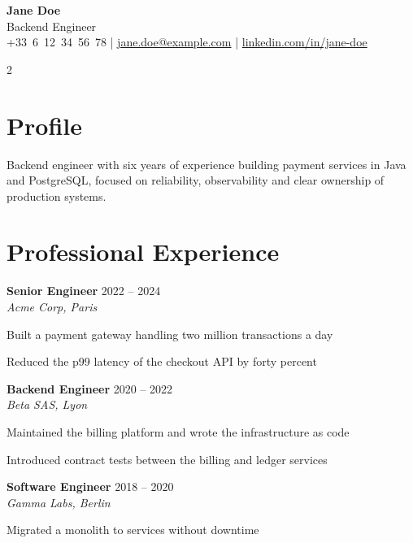 \documentclass[10pt]{extarticle}
\newcommand{\role}[3]{%
  \textbf{#1} \hfill {\color{soft}\small #3}\\[-1pt]
  {\itshape\small #2}\par
}
\begin{document}
\begin{center}
    {\fontsize{18}{18}\selectfont\bfseries\color{accent} Jane Doe}\\[3pt]
    {\normalsize\color{soft} Backend Engineer}\\[4pt]
    {\footnotesize
      +33~6~12~34~56~78 \quad|\quad
      \href{mailto:jane.doe@example.com}{jane.doe@example.com} \quad|\quad
      \href{https://www.linkedin.com/in/jane-doe}{linkedin.com/in/jane-doe}
    }
\end{center}
\vspace{-9pt}

\begin{multicols}{2}
\section{Profile}

Backend engineer with six years of experience building payment services in Java and PostgreSQL, focused on reliability, observability and clear ownership of production systems.

\section{Professional Experience}

\role{Senior Engineer}{Acme Corp, Paris}{2022 – 2024}

\begin{tightlist}
    \item Built a payment gateway handling two million transactions a day

    \item Reduced the p99 latency of the checkout API by forty percent

\end{tightlist}

\role{Backend Engineer}{Beta SAS, Lyon}{2020 – 2022}

\begin{tightlist}
    \item Maintained the billing platform and wrote the infrastructure as code

    \item Introduced contract tests between the billing and ledger services

\end{tightlist}

\role{Software Engineer}{Gamma Labs, Berlin}{2018 – 2020}

\begin{tightlist}
    \item Migrated a monolith to services without downtime


\end{tightlist}
\end{multicols}
\end{document}
